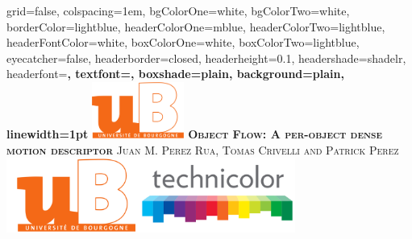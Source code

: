 \documentclass[landscape,final,a0paper,fontscale=0.285]{baposter}
\begin{document}
\begin{poster}%
  {
  grid=false,
  colspacing=1em,
  bgColorOne=white,
  bgColorTwo=white,
  borderColor=lightblue,
  headerColorOne=mblue,
  headerColorTwo=lightblue,
  headerFontColor=white,
  boxColorOne=white,
  boxColorTwo=lightblue,
  eyecatcher=false,
  headerborder=closed,
  headerheight=0.1\textheight,
  headershade=shadelr,
  headerfont=\Large\bf\textsc, %
  textfont={\setlength{\parindent}{1.5em}},
  boxshade=plain,
  background=plain,
  linewidth=1pt
  }
  {\includegraphics[height=5em]{../images/ubourgogne}} 
  {\bf\textsc{Object Flow: A per-object dense motion descriptor}\vspace{0.5em}}
  {\textsc{Juan M. Perez Rua, Tomas Crivelli and Patrick Perez}}
  {%
    \includegraphics[height=6.6em]{../images/technicolor_large}
  }

    \newcommand{\colouredcircle}{%
      \tikz{\useasboundingbox (-0.2em,-0.32em) rectangle(0.2em,0.32em); \draw[draw=black,fill=lightblue,line width=0.03em] (0,0) circle(0.18em);}}


\end{poster}
\end{document}

